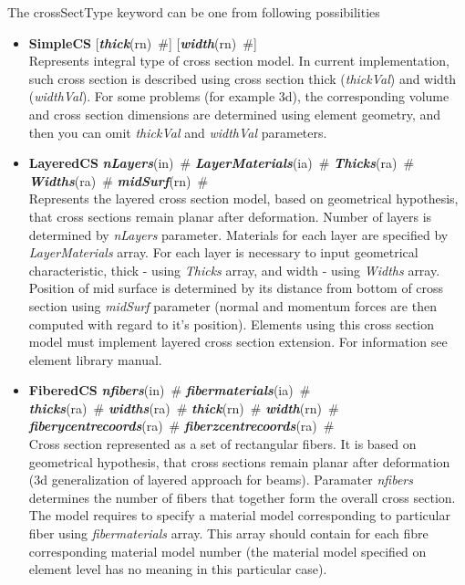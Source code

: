 \documentclass[draft]{article}
\newcommand{\param}[1]{{\em #1}}
\newcommand{\keywordnotype}[1]{\mbox{{\it{\bf{#1}}}}}
\newcommand{\keyword}[2]{\mbox{{\keywordnotype{#1}\tiny (#2)}}}
\newcommand{\entKeywordInst}[1]{\mbox{{\bf{{#1}}}}}
\newcommand{\field}[2]{\mbox{\keyword{#1}{#2}~\#}}
\newcommand{\optField}[2]{\mbox{[\field{#1}{#2}]}}
\begin{document}
The crossSectType keyword can be one from following possibilities
\begin{itemize}
\item \entKeywordInst{SimpleCS} \optField{thick}{rn}
\optField{width}{rn}\\
Represents integral type of cross section model. In current
implementation, such cross section is described using cross section
thick (\param{thickVal}) and width (\param{widthVal}). For some
problems (for example 
3d), the corresponding volume and cross section dimensions are
determined using element geometry, and then you can omit \param{thickVal} and \param{widthVal}
parameters. 
\item \entKeywordInst{LayeredCS} \field{nLayers}{in}
\field{LayerMaterials}{ia} \field{Thicks}{ra}\\
\field{Widths}{ra} {\field{mid\-Surf}{rn}}\\
Represents the layered cross section model, based on
geometrical hypothesis, that cross sections remain planar after
deformation. Number of layers is
determined by \param{nLayers} parameter. Materials for each
layer are specified by \param{LayerMaterials} array. For each layer is
necessary to input 
geometrical characteristic, thick - using \param{Thicks} array, and
width - using 
\param{Widths} array. Position of mid surface is determined by its
distance from 
bottom of cross section using \param{mid\-Surf} parameter (normal and
momentum forces are then computed with regard to it's position).
Elements using this cross section model must implement layered cross
section extension. For information see element library manual.
\item \entKeywordInst{FiberedCS} \field{nfibers}{in} \field{fibermaterials}{ia}\\
\field{thicks}{ra} \field{widths}{ra} \field{thick}{rn} \field{width}{rn}\\
\field{fiberycentrecoords}{ra} \field{fiberzcentrecoords}{ra}\\
Cross section represented as a set of rectangular fibers. It is based on
geometrical hypothesis, that cross sections remain planar after
deformation (3d generalization of layered approach for beams).
Paramater \param{nfibers} determines the number of fibers that together form the overall cross section. 
The model requires to specify a material model corresponding to particular fiber using \param{fibermaterials} array. This array should contain for each fibre corresponding material model number (the material model specified on element level has no meaning in this particular case).

\end{itemize}
\end{document}
